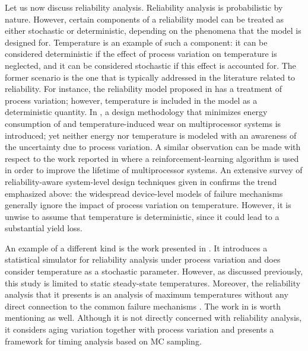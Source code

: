 Let us now discuss reliability analysis. Reliability analysis is probabilistic
by nature. However, certain components of a reliability model can be treated as
either stochastic or deterministic, depending on the phenomena that the model is
designed for. Temperature is an example of such a component: it can be
considered deterministic if the effect of process variation on temperature is
neglected, and it can be considered stochastic if this effect is accounted for.
The former scenario is the one that is typically addressed in the literature
related to reliability. For instance, the reliability model proposed in
\cite{xiang2010} has a treatment of process variation; however, temperature is
included in the model as a deterministic quantity. In \cite{das2014a}, a design
methodology that minimizes energy consumption of and temperature-induced wear on
multiprocessor systems is introduced; yet neither energy nor temperature is
modeled with an awareness of the uncertainty due to process variation. A similar
observation can be made with respect to the work reported in \cite{das2014c}
where a reinforcement-learning algorithm is used in order to improve the
lifetime of multiprocessor systems. An extensive survey of reliability-aware
system-level design techniques given in \cite{das2014b} confirms the trend
emphasized above: the widespread device-level models of failure mechanisms
generally ignore the impact of process variation on temperature. However, it is
unwise to assume that temperature is deterministic, since it could lead to a
substantial yield loss.

An example of a different kind is the work presented in \cite{lee2013}. It
introduces a statistical simulator for reliability analysis under process
variation and does consider temperature as a stochastic parameter. However, as
discussed previously, this study is limited to static steady-state temperatures.
Moreover, the reliability analysis that it presents is an analysis of maximum
temperatures without any direct connection to the common failure mechanisms
\cite{jedec2016}. The work in \cite{kiamehr2016} is worth mentioning as well.
Although it is not directly concerned with reliability analysis, it considers
aging variation together with process variation and presents a framework for
timing analysis based on \ac{MC} sampling.

